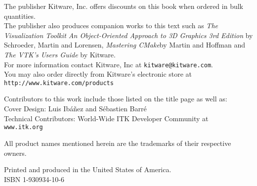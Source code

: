 \begin{minipage}[t][3.0cm][b]{\textwidth}
\begin{center}
The publisher Kitware, Inc. offers discounts on this book when ordered in
bulk quantities.\\
The publisher also produces companion works to this text such as \emph{The
Visualization Toolkit An Object-Oriented Approach to 3D Graphics 3rd Edition}
by Schroeder, Martin and Lorensen, \emph{Mastering CMake}by Martin and
Hoffman and \emph{The VTK's Users Guide} by Kitware.\\
For more information contact Kitware, Inc at \texttt{kitware@kitware.com}.\\
You may also order directly from Kitware's electronic store at
\texttt{http://www.kitware.com/products}\\
\end{center}
\end{minipage}

\begin{minipage}[t][2.0cm][b]{\textwidth}
\begin{center}
Contributors to this work include those listed on the title page as well as:\\
Cover Design: Luis Ib\'{a}\~{n}ez and S\'{e}bastien Barr\'{e}\\
Technical Contributors: World-Wide ITK Developer Community at\\
\texttt{www.itk.org}
\end{center}
\end{minipage}


\begin{minipage}[t][1.5cm][b]{\textwidth}
\begin{center}
All product names mentioned herein are the trademarks of their respective 
owners.
\end{center}
\end{minipage}


\begin{minipage}[t][1.5cm][b]{\textwidth}
\begin{center}
Printed and produced in the United States of America.\\
ISBN 1-930934-10-6
\end{center}
\end{minipage}
